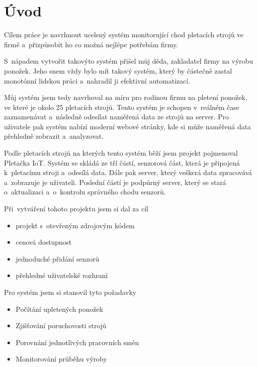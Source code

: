 \chapter*{Úvod}
Cílem práce je navrhnout ucelený systém monitorující chod pletacích strojů ve firmě a~přizpůsobit ho co možná nejlépe potřebám firmy.

S~nápadem vytvořit takovýto systém přišel můj děda, zakladatel firmy na výrobu ponožek.
Jeho snem vždy bylo mít takový systém, který by částečně zastal monotónní lidskou práci a~nahradil ji efektivní automatizací.

Můj systém jsem tedy navrhoval na míru pro rodinou firmu na pletení ponožek, ve které je okolo 25 pletacích strojů. 
Tento systém je schopen v~reálném čase zaznamenávat a~následně odesílat naměřená data ze strojů na server. 
Pro uživatele pak systém nabízí moderní webové stránky, kde si může naměřená data přehledně zobrazit a~analyzovat.

Podle pletacích strojů na kterých tento systém běží jsem projekt pojmenoval Pletačka IoT. 
Systém se skládá ze tří částí, senzorová část, která je připojená k~pletacímu stroji a~odesílá data.
Dále pak server, který veškerá data zpracovává a~zobrazuje je uživateli.
Poslední částí je podpůrný server, který se stará o~aktualizaci a~o~kontrolu správného chodu senzorů.\newline


Při~vytváření tohoto projektu jsem si dal za cíl
\begin{itemize}
    \item projekt s~otevřeným zdrojovým kódem
    \item cenová dostupnost
    \item jednoduché přidání senzorů
    \item přehledné uživatelské rozhraní
\end{itemize}

Pro systém jsem si stanovil tyto požadavky
\begin{itemize}
    \item Počítání upletených ponožek
    \item Zjišťování poruchovosti strojů
    \item Porovnání jednotlivých pracovních směn
    \item Monitorování průběhu výroby
\end{itemize}

\newpage
